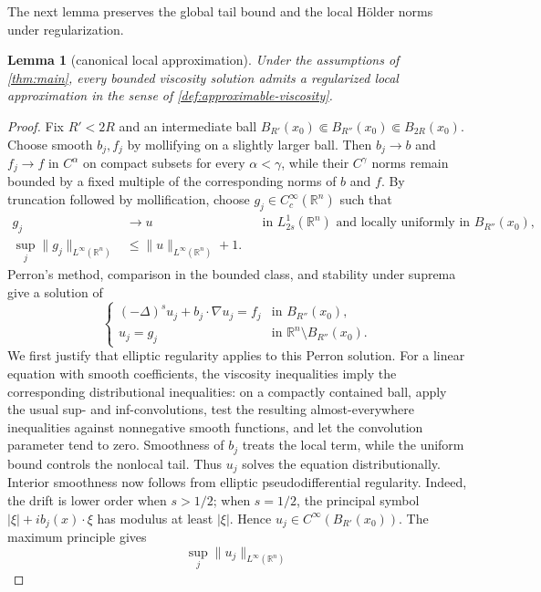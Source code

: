\documentclass[reqno]{amsart}
\numberwithin{equation}{section}
\theoremstyle{plain}
\newtheorem{lemma}[theorem]{Lemma}
\theoremstyle{definition}
\theoremstyle{remark}
\newcommand{\R}{\mathbb R}
\newcommand{\rev}[1]{#1}
\begin{document}
\rev{The next lemma preserves the global tail bound and the local
H\"older norms under regularization.}

\begin{lemma}[canonical local approximation]
\label{lem:canonical-approximation}
Under the assumptions of \cref{thm:main}, every bounded viscosity solution
admits a regularized local approximation in the sense of
\cref{def:approximable-viscosity}.
\end{lemma}

\begin{proof}
\begingroup
Fix $R'<2R$ and an intermediate ball
$B_{R'}(x_0)\Subset B_{R''}(x_0)\Subset B_{2R}(x_0)$.  Choose smooth
$b_j,f_j$ by mollifying on a slightly larger ball.  Then $b_j\to b$ and
$f_j\to f$ in $C^\alpha$ on compact subsets for every $\alpha<\gamma$,
while their $C^\gamma$ norms remain bounded by a fixed multiple of the
corresponding norms of $b$ and $f$.  By truncation followed by
mollification, choose $g_j\in C_c^\infty(\R^n)$
such that
\[
 \begin{aligned}
 g_j&\to u &&\text{in }L^1_{2s}(\R^n)\text{ and locally uniformly in }
 B_{R''}(x_0),\\
 \sup_j\|g_j\|_{L^\infty(\R^n)}&\le
 \|u\|_{L^\infty(\R^n)}+1.
 \end{aligned}
\]
Perron's method, comparison in the bounded class, and stability under
suprema \cite[Theorem~2]{BarlesImbert2008} give a solution of
\[
 \begin{cases}
 (-\Delta)^su_j+b_j\cdot\nabla u_j=f_j&\text{in }B_{R''}(x_0),\\
 u_j=g_j&\text{in }\R^n\setminus B_{R''}(x_0).
 \end{cases}
\]
We first justify that elliptic regularity applies to this Perron solution.
For a linear equation with smooth coefficients, the viscosity inequalities
imply the corresponding distributional inequalities: on a compactly
contained ball, apply the usual sup- and inf-convolutions, test the resulting
almost-everywhere inequalities against nonnegative smooth functions, and let
the convolution parameter tend to zero.  Smoothness of $b_j$ treats the local
term, while the uniform bound controls the nonlocal tail.  Thus $u_j$ solves
the equation distributionally.  Interior smoothness now follows from
elliptic pseudodifferential regularity.  Indeed, the drift is lower order when
$s>1/2$; when $s=1/2$, the principal symbol
$|\xi|+i b_j(x)\cdot\xi$ has modulus at least $|\xi|$.  Hence
$u_j\in C^\infty(B_{R'}(x_0))$.  The maximum principle gives
\[
 \sup_j\|u_j\|_{L^\infty(\R^n)}
\]
\end{proof}
\end{document}
